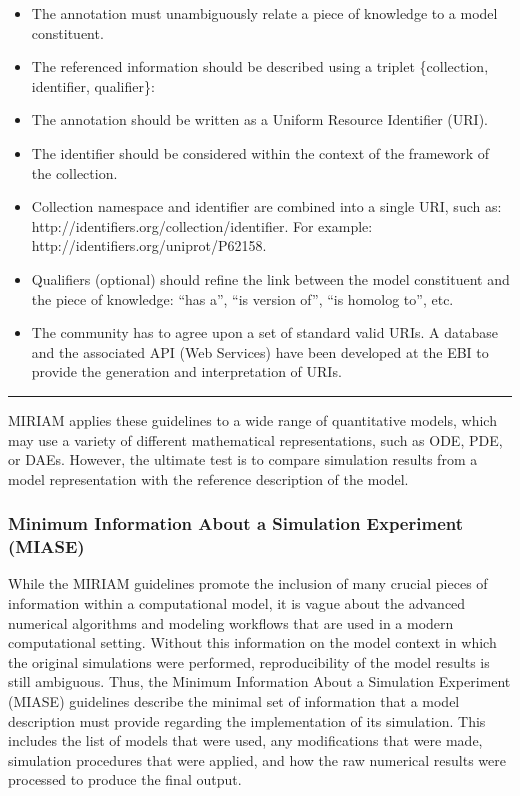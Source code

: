 \begin{itemize}
\item
  The annotation must unambiguously relate a piece of knowledge to a
  model constituent.
\item
  The referenced information should be described using a triplet
  \{collection, identifier, qualifier\}:
\item
  The annotation should be written as a Uniform Resource Identifier
  (URI).
\item
  The identifier should be considered within the context of the
  framework of the collection.
\item
  Collection namespace and identifier are combined into a single URI,
  such as: http://identifiers.org/collection/identifier. For example:
  http://identifiers.org/uniprot/P62158.
\item
  Qualifiers (optional) should refine the link between the model
  constituent and the piece of knowledge: ``has a'', ``is version of'',
  ``is homolog to'', etc.
\item
  The community has to agree upon a set of standard valid URIs. A
  database and the associated API (Web Services) have been developed at
  the EBI to provide the generation and interpretation of URIs.
\end{itemize}
\begin{center}\rule{3in}{0.4pt}\end{center}

MIRIAM applies these guidelines to a wide range of quantitative models,
which may use a variety of different mathematical representations, such
as ODE, PDE, or DAEs. However, the ultimate test is to compare
simulation results from a model representation with the reference
description of the model.

\subsubsection{Minimum Information About a Simulation Experiment
(MIASE)}

While the MIRIAM guidelines promote the inclusion of many crucial pieces
of information within a computational model, it is vague about the
advanced numerical algorithms and modeling workflows that are used in a
modern computational setting. Without this information on the model
context in which the original simulations were performed,
reproducibility of the model results is still ambiguous. Thus, the
Minimum Information About a Simulation Experiment (MIASE) guidelines
\autocite{waltemath2011minimum} describe the minimal set of information
that a model description must provide regarding the implementation of
its simulation. This includes the list of models that were used, any
modifications that were made, simulation procedures that were applied,
and how the raw numerical results were processed to produce the final
output.

